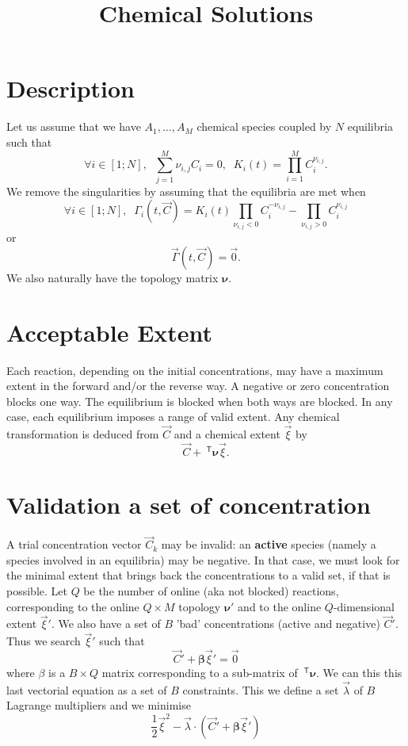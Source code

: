 \documentclass[aps]{revtex4}
\newcommand{\mymat}[1]{\bm{#1}}
\newcommand{\mytrn}[1]{~^{\mathsf{T}}{#1}}
\begin{document}
\title{Chemical Solutions}

\section{Description}
Let us assume that we have $A_1,\ldots,A_M$ chemical species coupled by
$N$ equilibria such that
\begin{equation}
	\forall i \in [1;N], \;\; \sum_{j=1}^{M} \nu_{i,j} C_i = 0, \;\; K_i(t) = \prod_{i=1}^{M} C_i^{\nu_{i,j}}.
\end{equation}
We remove the singularities by assuming that the equilibria are met when
\begin{equation}
	\forall i \in [1;N], \;\; \Gamma_i(t,\vec{C}) = K_i(t) \prod_{\nu_{i,j}<0}  C_i^{-\nu_{i,j}} -  \prod_{\nu_{i,j}>0} C_i^{\nu_{i,j}} 
\end{equation}
or
\begin{equation}
	\vec{\Gamma}(t,\vec{C}) = \vec{0}.
\end{equation}
We also naturally have the topology matrix $\mymat{\nu}$.

\section{Acceptable Extent}
Each reaction, depending on the initial concentrations, may have a maximum extent in the forward and/or the reverse way.
A negative or zero concentration blocks one way. The equilibrium is blocked when both ways are blocked.
In any case, each equilibrium imposes a range of valid extent.
Any chemical transformation is deduced from $\vec{C}$ and a chemical extent $\vec{\xi}$ by
$$
	\vec{C} + \mytrn{\mymat{\nu}}\vec{\xi}.
$$

\section{Validation a set of concentration}
A trial concentration vector $\vec{C}_k$ may be invalid: an \textbf{active} species (namely a species involved in an equilibria)
may be negative. In that case, we must look for the minimal extent that brings back the concentrations to a valid set, if that
is possible.
Let $Q$ be the number of online (aka not blocked) reactions, corresponding to the online $Q\times M$ topology $\mymat{\nu}'$
and to the online $Q$-dimensional extent $\vec{\xi}'$. We also have a set of $B$ 'bad' concentrations (active and negative) $\vec{C}'$.
Thus we search $\vec{\xi}'$ such that
$$
	\vec{C}' + \mymat{\beta} \vec{\xi}' = \vec{0}
$$
where $\beta$ is a $B\times Q$ matrix corresponding to a sub-matrix of $\mytrn{\mymat{\nu}}$.
We can this this last vectorial equation as a set of $B$ constraints. This we define a set
$\vec{\lambda}$ of $B$ Lagrange multipliers and we minimise
$$
	\dfrac{1}{2} \vec{\xi}^2 - \vec{\lambda}\cdot\left(\vec{C}' + \mymat{\beta} \vec{\xi}'\right)
$$
	
\end{document}
